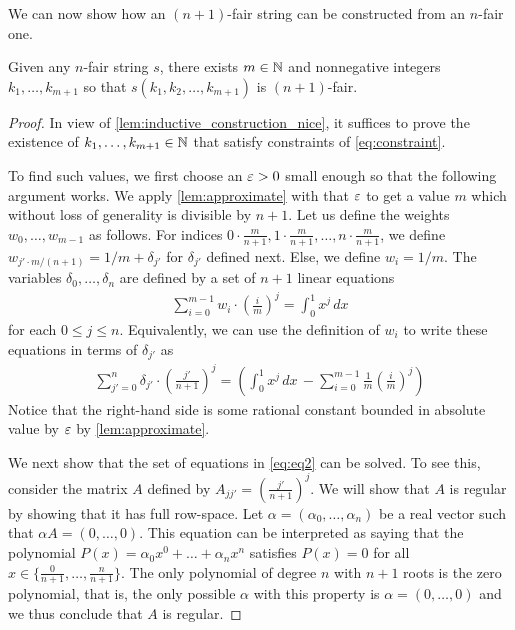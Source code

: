 \documentclass{article}
\begin{document}
We can now show how an $(n+1)$-fair string can be constructed from an $n$-fair one. 
\begin{theorem}
\label{thm:main_algebra}
    Given any $n$-fair string $s$, there exists $m \in \mathbb{N}$ and nonnegative integers $k_1, \dots, k_{m+1}$ so that $s(k_1, k_2, \dots, k_{m+1})$ is $(n+1)$-fair. 
\end{theorem}
\begin{proof}
    In view of \cref{lem:inductive_construction_nice}, it suffices to prove the existence of $k_1, \dots, k_{m+1} \in \mathbb{N}$ that satisfy constraints of \cref{eq:constraint}. 

    To find such values, we first choose an $\varepsilon > 0$ small enough so that the following argument works. 
    We apply \cref{lem:approximate} with that $\varepsilon$ to get a value $m$ which without loss of generality is divisible by $n+1$. 
    Let us define the weights $w_0, \dots, w_{m-1}$ as follows. For indices $0\cdot\frac{m}{n+1}, 1\cdot \frac{m}{n+1}, \dots, n\cdot \frac{m}{n+1}$, we define $w_{j'\cdot m/(n+1)} = 1/m + \delta_{j'}$ for $\delta_{j'}$ defined next. Else, we define $w_i = 1/m$.  
    The variables $\delta_0, \dots, \delta_{n}$ are defined by a set of $n+1$ linear equations
    \begin{align}
        \label{eq:eq}
        \sum_{i = 0}^{m-1} w_i \cdot \left( \frac{i}{m} \right)^j  = \int_0^1 x^j \,dx 
    \end{align}
    for each $0 \le j \le n$. 
    Equivalently, we can use the definition of $w_i$ to write these equations in terms of $\delta_{j'}$ as
    \begin{align}
        \label{eq:eq2}
        \sum_{j' = 0}^{n} \delta_{j'} \cdot \left( \frac{j'}{n+1} \right)^j  = \left( \int_0^1 x^j \,dx\, -  \sum_{i = 0}^{m-1}  \frac{1}{m}  \left( \frac{i}{m} \right)^j \right)
    \end{align}
    Notice that the right-hand side is some rational constant bounded in absolute value by $\varepsilon$ by \cref{lem:approximate}. 
    
We next show that the set of equations in \cref{eq:eq2} can be solved. To see this, consider the matrix $A$ defined by $A_{jj'} = \left( \frac{j'}{n+1} \right)^j $. We will show that $A$ is regular by showing that it has full row-space. 
Let $\alpha = (\alpha_0, \dots, \alpha_n)$ be a real vector such that $\alpha A = (0, \dots, 0)$. This equation can be interpreted as saying that the polynomial $P(x) = \alpha_0 x^0 + \dots + \alpha_n x^n$ satisfies $P(x) = 0$ for all $x \in \{ \frac{0}{n+1}, \dots, \frac{n}{n+1}\}$. The only polynomial of degree $n$ with $n+1$ roots is the zero polynomial, that is, the only possible $\alpha$ with this property is $\alpha = (0, \dots, 0)$ and we thus conclude that $A$ is regular. 


\end{proof}
\end{document}

